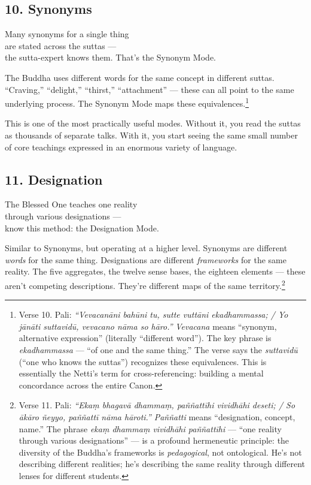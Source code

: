 \subsection*{10. Synonyms}

\begin{versebox}
Many synonyms for a single thing\\
are stated across the suttas ---\\
the sutta-expert knows them. That's the Synonym Mode.
\end{versebox}

The Buddha uses different words for the same concept in different suttas. ``Craving,'' ``delight,'' ``thirst,'' ``attachment'' --- these can all point to the same underlying process. The Synonym Mode maps these equivalences.\footnote{Verse 10. Pali: \textit{``Vevacanāni bahūni tu, sutte vuttāni ekadhammassa; / Yo jānāti suttavidū, vevacano nāma so hāro.''} \textit{Vevacana} means ``synonym, alternative expression'' (literally ``different word''). The key phrase is \textit{ekadhammassa} --- ``of one and the same thing.'' The verse says the \textit{suttavidū} (``one who knows the suttas'') recognizes these equivalences. This is essentially the Netti's term for cross-referencing: building a mental concordance across the entire Canon.}

This is one of the most practically useful modes. Without it, you read the suttas as thousands of separate talks. With it, you start seeing the same small number of core teachings expressed in an enormous variety of language.

\subsection*{11. Designation}

\begin{versebox}
The Blessed One teaches one reality\\
through various designations ---\\
know this method: the Designation Mode.
\end{versebox}

Similar to Synonyms, but operating at a higher level. Synonyms are different \textit{words} for the same thing. Designations are different \textit{frameworks} for the same reality. The five aggregates, the twelve sense bases, the eighteen elements --- these aren't competing descriptions. They're different maps of the same territory.\footnote{Verse 11. Pali: \textit{``Ekaṃ bhagavā dhammaṃ, paññattīhi vividhāhi deseti; / So ākāro ñeyyo, paññattī nāma hāroti.''} \textit{Paññatti} means ``designation, concept, name.'' The phrase \textit{ekaṃ dhammaṃ vividhāhi paññattīhi} --- ``one reality through various designations'' --- is a profound hermeneutic principle: the diversity of the Buddha's frameworks is \textit{pedagogical}, not ontological. He's not describing different realities; he's describing the same reality through different lenses for different students.}

